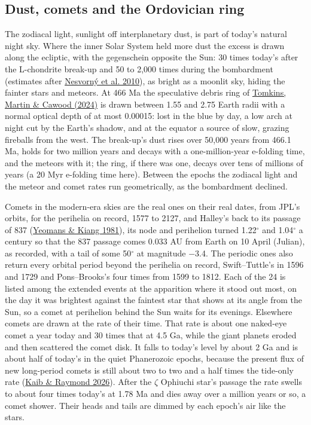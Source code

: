 \documentclass[9pt,twocolumn]{extarticle}
\begin{document}
\subsection{Dust, comets and the Ordovician ring}\label{dust-comets-and-the-ordovician-ring}

The zodiacal light, sunlight off interplanetary dust, is part of today's natural night sky. Where the inner Solar System held more dust the excess is drawn along the ecliptic, with the gegenschein opposite the Sun: 30 times today's after the L-chondrite break-up and 50 to 2,000 times during the bombardment (estimates after \protect\hyperlink{cite.nesvorny2010}{Nesvorný et al. 2010}), as bright as a moonlit sky, hiding the fainter stars and meteors. At 466 Ma the speculative debris ring of \protect\hyperlink{cite.tomkins2024}{Tomkins, Martin \& Cawood (2024)} is drawn between 1.55 and 2.75 Earth radii with a normal optical depth of at most 0.00015: lost in the blue by day, a low arch at night cut by the Earth's shadow, and at the equator a source of slow, grazing fireballs from the west. The break-up's dust rises over 50,000 years from 466.1 Ma, holds for two million years and decays with a one-million-year e-folding time, and the meteors with it; the ring, if there was one, decays over tens of millions of years (a 20 Myr e-folding time here). Between the epochs the zodiacal light and the meteor and comet rates run geometrically, as the bombardment declined.

Comets in the modern-era skies are the real ones on their real dates, from JPL's orbits, for the perihelia on record, 1577 to 2127, and Halley's back to its passage of 837 (\protect\hyperlink{cite.yeomans1981}{Yeomans \& Kiang 1981}), its node and perihelion turned 1.22$^\circ$ and 1.04$^\circ$ a century so that the 837 passage comes 0.033 AU from Earth on 10 April (Julian), as recorded, with a tail of some 50$^\circ$ at magnitude $-$3.4. The periodic ones also return every orbital period beyond the perihelia on record, Swift--Tuttle's in 1596 and 1729 and Pons--Brooks's four times from 1599 to 1812. Each of the 24 is listed among the extended events at the apparition where it stood out most, on the day it was brightest against the faintest star that shows at its angle from the Sun, so a comet at perihelion behind the Sun waits for its evenings. Elsewhere comets are drawn at the rate of their time. That rate is about one naked-eye comet a year today and 30 times that at 4.5 Ga, while the giant planets eroded and then scattered the comet disk. It falls to today's level by about 2 Ga and is about half of today's in the quiet Phanerozoic epochs, because the present flux of new long-period comets is still about two to two and a half times the tide-only rate (\protect\hyperlink{cite.kaib2026}{Kaib \& Raymond 2026}). After the $\zeta$ Ophiuchi star's passage the rate swells to about four times today's at 1.78 Ma and dies away over a million years or so, a comet shower. Their heads and tails are dimmed by each epoch's air like the stars.
\end{document}
